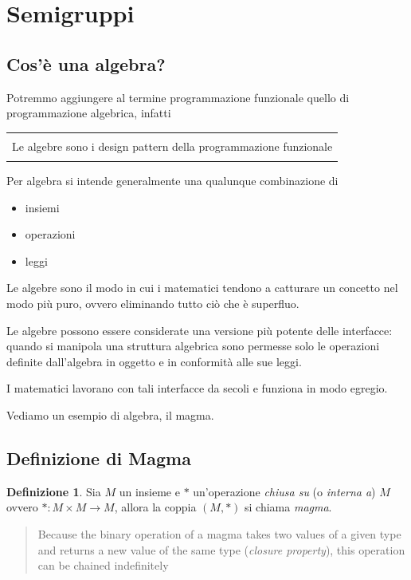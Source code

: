 \documentclass[12pt]{article}
\theoremstyle{definition}
\newtheorem{definition}{Definizione}[section]
\newenvironment{demo}
    {\begin{center}
    \begin{tabular}{|p{0.9\textwidth}|}
    \hline\\
    }
    {
    \\\\\hline
    \end{tabular}
    \end{center}
    }
\begin{document}
\section{Semigruppi}

\subsection{Cos'è una algebra?}

Potremmo aggiungere al termine programmazione funzionale quello di programmazione algebrica, infatti

\begin{demo}
Le algebre sono i design pattern della programmazione funzionale
\end{demo}

Per algebra si intende generalmente una qualunque combinazione di

\begin{itemize}
  \item insiemi
  \item operazioni
  \item leggi
\end{itemize}

Le algebre sono il modo in cui i matematici tendono a catturare un concetto nel modo più puro,
ovvero eliminando tutto ciò che è superfluo.

Le algebre possono essere considerate una versione più potente delle interfacce: quando si manipola una struttura algebrica
sono permesse solo le operazioni definite dall'algebra in oggetto e in conformità alle sue leggi.

I matematici lavorano con tali interfacce da secoli e funziona in modo egregio.

Vediamo un esempio di algebra, il magma.

\subsection{Definizione di Magma}

\begin{definition}
Sia $M$ un insieme e $*$ un'operazione \emph{chiusa su} (o \emph{interna a}) $M$ ovvero $*: M \times M \rightarrow M$,
allora la coppia $(M, *)$ si chiama \emph{magma}.
\end{definition}

\begin{quote}
Because the binary operation of a magma takes two values of a given type and returns a new value of the same type (\emph{closure property}),
this operation can be chained indefinitely
\end{quote}
\end{document}

